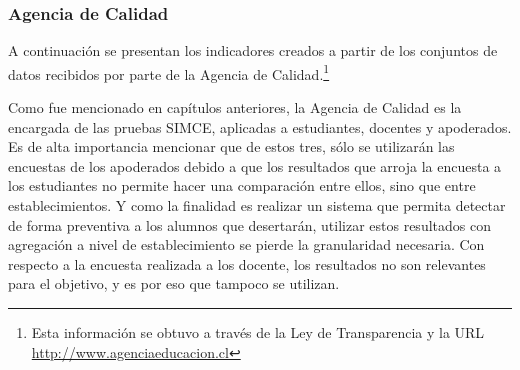 \subsubsection{Agencia de Calidad}
A continuación se presentan los indicadores creados a partir de los conjuntos de datos recibidos por parte de la Agencia de Calidad.\footnote{Esta información se obtuvo a través de la Ley de Transparencia y la URL \url{http://www.agenciaeducacion.cl}}

Como fue mencionado en capítulos anteriores, la Agencia de Calidad es la encargada de las pruebas SIMCE, aplicadas a estudiantes, docentes y apoderados. Es de alta importancia mencionar que de estos tres, sólo se utilizarán las encuestas de los apoderados debido a que los resultados que arroja la encuesta a los estudiantes no permite hacer una comparación entre ellos, sino que entre establecimientos. Y como la finalidad es realizar un sistema que permita detectar de forma preventiva a los alumnos que desertarán, utilizar estos resultados con agregación a nivel de establecimiento se pierde la granularidad necesaria. Con respecto a la encuesta realizada a los docente, los resultados no son relevantes para el objetivo, y es por eso que tampoco se utilizan. 

